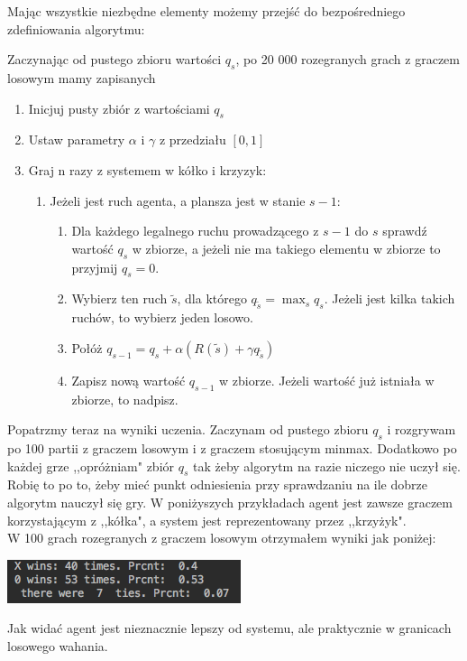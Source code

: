 \documentclass[licencjacka]{pracamgr}
\begin{document}
Mając wszystkie niezbędne elementy możemy przejść do bezpośredniego zdefiniowania algorytmu:



Zaczynając od pustego zbioru wartości $q_{s}$, po 20 000 rozegranych grach z graczem losowym mamy zapisanych 


\begin{enumerate}
	\item{Inicjuj pusty zbiór z wartościami $q_{s}$}
	\item{Ustaw parametry $\alpha$ i $\gamma$ z przedziału $[0, 1]$}
	\item{Graj n razy z systemem w kółko i krzyzyk:}
	\begin{enumerate}
		\item{Jeżeli jest ruch agenta, a plansza jest w stanie $s-1$:}
		\begin{enumerate}
			\item{Dla każdego legalnego ruchu prowadzącego z $s-1$ do $s$  sprawdź wartość $q_{s}$ w zbiorze, a jeżeli nie ma takiego elementu w zbiorze to przyjmij $q_{s}=0$.}
			\item{Wybierz ten ruch $\tilde{s}$, dla którego $q_{\tilde{s}} =\max_{s} q_{s}$. Jeżeli jest kilka takich ruchów, to wybierz jeden losowo.}
			\item{Połóż $q_{s-1} = q_{s} + \alpha(R(\tilde{s}) + \gamma  q_{\tilde{s}} )$ }
			\item{Zapisz nową wartość $q_{s-1}$ w zbiorze. Jeżeli wartość już istniała w zbiorze, to nadpisz.}
		\end{enumerate}
	\end{enumerate}
\end{enumerate}

Popatrzmy teraz na wyniki uczenia. Zaczynam od pustego zbioru $q_{s}$ i rozgrywam po 100 partii z graczem losowym i z graczem stosującym minmax. Dodatkowo po każdej grze ,,opróżniam" zbiór $q_{s}$ tak żeby algorytm na razie niczego nie uczył się. Robię to po to, żeby mieć punkt odniesienia przy sprawdzaniu na ile dobrze algorytm nauczył się gry. W poniżyszych przykładach agent jest zawsze graczem korzystającym z ,,kółka", a system jest reprezentowany przez ,,krzyżyk". \\

W 100 grach rozegranych z graczem losowym otrzymałem wyniki jak poniżej:
\begin{flushleft}
	\includegraphics [scale=0.7]{Qtable_vs_Rnd_untrained.png}
\end{flushleft}
Jak widać agent jest nieznacznie lepszy od systemu, ale praktycznie w granicach losowego wahania.\\
\end{document}

